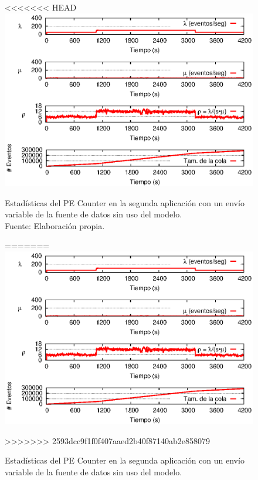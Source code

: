 \begin{figure}[!ht]
<<<<<<< HEAD
    \centering
    \captionsetup{justification=centering}
    \includegraphics[scale=1]{images/exp/app2/normal/sm/statusCounterPE.eps}
    \caption[Estadísticas del PE Counter en la segunda aplicación con un envío variable de la fuente de datos sin uso del modelo.]{Estadísticas del PE Counter en la segunda aplicación con un envío variable de la fuente de datos sin uso del modelo.\\Fuente: Elaboración propia.}
=======
\centering
    \includegraphics[scale=1.1]{images/exp/app2/normal/sm/statusCounterPE.eps}
    \caption{Estad\'isticas del PE Counter en la segunda aplicaci\'on con un env\'io variable de la fuente de datos sin uso del modelo.}
>>>>>>> 2593dcc9f1f0f407aaed2b40f87140ab2e858079
    \label{fig:app2-normal-statusCounterPE-sm}
\end{figure}

